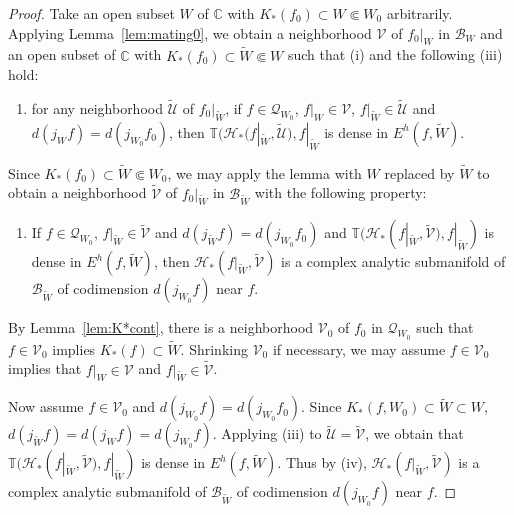 \documentclass{amsart}
\numberwithin{equation}{section}
\newcommand{\C}{\mathbb C}
\theoremstyle{definition}
\theoremstyle{remark}
\begin{document}
\begin{proof}  Take an open subset $W$ of $\C$ with $K_*(f_0)\subset W\Subset W_0$ arbitrarily.   Applying Lemma~\ref{lem:mating0}, we obtain a neighborhood $\mathcal{V}$ of $f_0|_W$ in $\mathcal{B}_W$ and an open subset of $\C$ with $K_*(f_0)\subset \widetilde{W}\Subset W$ such that (i) and the following (iii) hold: 
\begin{enumerate}
\item [(iii)] for any neighborhood $\mathcal{\widetilde{U}}$ of $f_0|_{\widetilde{W}}$, if $f\in \mathcal{Q}_{W_0}$, $f|_W\in \mathcal{V}$, $f|_{\widetilde{W}}\in \mathcal{\widetilde{U}}$ and $d(j_{W}f)=d(j_{W_0}f_0)$, then 
$\mathbb{T}(\mathcal{H}_*(f|_{\widetilde{W}},\widetilde{\mathcal{U}}), f|_{\widetilde{W}}$ is dense in $E^h(f, \widetilde{W})$. 
\end{enumerate}

Since $K_*(f_0)\subset \widetilde{W}\Subset W_0$, we may apply the lemma with $W$ replaced by $\widetilde{W}$ to obtain a neighborhood $\widetilde{\mathcal{V}}$ of $f_0|_{\widetilde{W}}$ in $\mathcal{B}_{\widetilde{W}}$ with the following property: 
\begin{enumerate}
\item[(iv)] If $f\in \mathcal{Q}_{W_0}$, $f|_{\widetilde{W}}\in \widetilde{\mathcal{V}}$ and $d(j_{\widetilde{W}}f)=d(j_{W_0}f_0)$ and $\mathbb{T}(\mathcal{H}_*(f|_{\widetilde{W}},\widetilde{\mathcal{V}}), f|_{\widetilde{W}})$ is dense in $E^h(f,\widetilde{W})$, then $\mathcal{H}_*(f|_{\widetilde{W}},\widetilde{\mathcal{V}})$ is a complex analytic submanifold of $\mathcal{B}_{\widetilde{W}}$ of codimension $d(j_{W_0}f)$ near $f$.  
\end{enumerate}
By Lemma~\ref{lem:K*cont}, there is a neighborhood $\mathcal{V}_0$ of $f_0$ in $\mathcal{Q}_{W_0}$ such that $f\in \mathcal{V}_0$ implies $K_*(f)\subset \widetilde{W}$. Shrinking $\mathcal{V}_0$ if necessary, we may assume $f\in \mathcal{V}_0$ implies that $f|_W\in \mathcal{V}$ and $f|_{\widetilde{W}}\in \widetilde{\mathcal{V}}$. 

Now assume $f\in \mathcal{V}_0$ and $d(j_{W_0}f)=d(j_{W_0}f_0)$. Since $K_*(f,W_0)\subset \widetilde{W}\subset W$, $d(j_{\widetilde{W}}f)=d(j_Wf)=d(j_{W_0}f)$.  
Applying (iii) to $\widetilde{\mathcal{U}}=\widetilde{\mathcal{V}}$, we obtain that $\mathbb{T}(\mathcal{H}_*(f|_{\widetilde{W}},\widetilde{\mathcal{V}}), f|_{\widetilde{W}})$ is dense in $E^h(f,\widetilde{W})$. Thus by (iv), $\mathcal{H}_*(f|_{\widetilde{W}},\widetilde{\mathcal{V}})$ is a complex analytic submanifold of $\mathcal{B}_{\widetilde{W}}$ of codimension $d(j_{W_0}f)$ near $f$.  
\end{proof}
\end{document}
